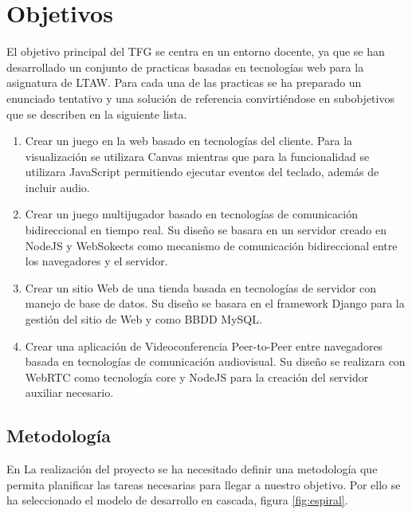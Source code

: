 \chapter{Objetivos} 
El objetivo principal del TFG se centra en un entorno docente, ya que se han desarrollado un conjunto de practicas basadas en tecnologías web para la asignatura de LTAW. Para cada una de las practicas se ha preparado un enunciado tentativo y una solución de referencia convirtiéndose en subobjetivos que se describen en la siguiente lista.
\begin{enumerate}
\item  Crear un juego en la web basado en tecnologías del cliente. Para la visualización se utilizara Canvas mientras que para la funcionalidad se utilizara JavaScript permitiendo ejecutar eventos del teclado, además de incluir audio.
\item Crear un juego multijugador basado en tecnologías de comunicación bidireccional en tiempo real. Su diseño se basara en un servidor creado en NodeJS y WebSokects como mecanismo de comunicación bidireccional entre los navegadores y el servidor.
\item Crear un sitio Web de una tienda basada en tecnologías de servidor con manejo de base de datos. Su diseño se basara en el framework Django para la gestión del sitio de Web y como BBDD MySQL.
\item Crear una aplicación de Videoconferencia Peer-to-Peer entre navegadores basada en tecnologías de comunicación audiovisual. Su diseño se realizara con WebRTC como tecnología core y NodeJS para la creación del servidor auxiliar necesario.
\end{enumerate}
\section{Metodología}
En La realización del proyecto se ha necesitado definir una metodología que permita planificar las tareas necesarias para llegar a nuestro objetivo. Por ello se ha seleccionado el modelo de desarrollo en cascada, figura \ref{fig:espiral}.

